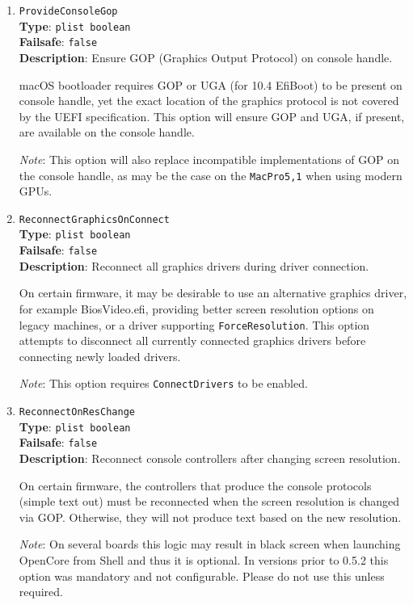 \documentclass[]{article}
\begin{document}
\begin{enumerate}
\item
  \texttt{ProvideConsoleGop}\\
  \textbf{Type}: \texttt{plist\ boolean}\\
  \textbf{Failsafe}: \texttt{false}\\
  \textbf{Description}: Ensure GOP (Graphics Output Protocol) on console handle.

  macOS bootloader requires GOP or UGA (for 10.4 EfiBoot) to be present on console
  handle, yet the exact location of the graphics protocol is not covered by the
  UEFI specification. This option will ensure GOP and UGA, if present, are available
  on the console handle.

  \emph{Note}: This option will also replace incompatible implementations of GOP on the
  console handle, as may be the case on the \texttt{MacPro5,1} when using modern GPUs.

\item
  \texttt{ReconnectGraphicsOnConnect}\\
  \textbf{Type}: \texttt{plist\ boolean}\\
  \textbf{Failsafe}: \texttt{false}\\
  \textbf{Description}: Reconnect all graphics drivers during driver connection.

  On certain firmware, it may be desirable to use an alternative graphics driver,
  for example BiosVideo.efi, providing better screen resolution options on legacy
  machines, or a driver supporting \texttt{ForceResolution}. This option attempts
  to disconnect all currently connected graphics drivers before connecting newly
  loaded drivers.

  \emph{Note}: This option requires \texttt{ConnectDrivers} to be enabled.

\item
  \texttt{ReconnectOnResChange}\\
  \textbf{Type}: \texttt{plist\ boolean}\\
  \textbf{Failsafe}: \texttt{false}\\
  \textbf{Description}: Reconnect console controllers after changing screen resolution.

  On certain firmware, the controllers that produce the console protocols (simple text out)
  must be reconnected when the screen resolution is changed via GOP. Otherwise, they will
  not produce text based on the new resolution.

  \emph{Note}: On several boards this logic may result in black screen when launching
  OpenCore from Shell and thus it is optional. In versions prior to 0.5.2 this option
  was mandatory and not configurable. Please do not use this unless required.


\end{enumerate}
\end{document}
